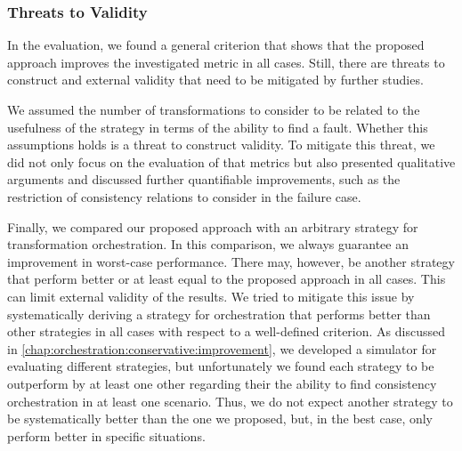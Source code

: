 



\subsubsection{Threats to Validity}

In the evaluation, we found a general criterion that shows that the proposed approach improves the investigated metric in all cases.
Still, there are threats to construct and external validity that need to be mitigated by further studies.

We assumed the number of transformations to consider to be related to the usefulness of the strategy in terms of the ability to find a fault.
Whether this assumptions holds is a threat to construct validity.
To mitigate this threat, we did not only focus on the evaluation of that metrics but also presented qualitative arguments and discussed further quantifiable improvements, such as the restriction of consistency relations to consider in the failure case.

Finally, we compared our proposed approach with an arbitrary strategy for transformation orchestration.
In this comparison, we always guarantee an improvement in worst-case performance.
There may, however, be another strategy that perform better or at least equal to the proposed approach in all cases.
This can limit external validity of the results.
We tried to mitigate this issue by systematically deriving a strategy for orchestration that performs better than other strategies in all cases with respect to a well-defined criterion.
As discussed in \autoref{chap:orchestration:conservative:improvement}, we developed a simulator for evaluating different strategies, but unfortunately we found each strategy to be outperform by at least one other regarding their the ability to find consistency orchestration in at least one scenario.
Thus, we do not expect another strategy to be systematically better than the one we proposed, but, in the best case, only perform better in specific situations.


